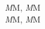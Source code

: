 \documentclass{article}
\begin{document}
	\noindent
	{\itshape M}M, {\slshape M}M\\
	{\itshape M\/}M, {\slshape M\/}M\\
\end{document}
